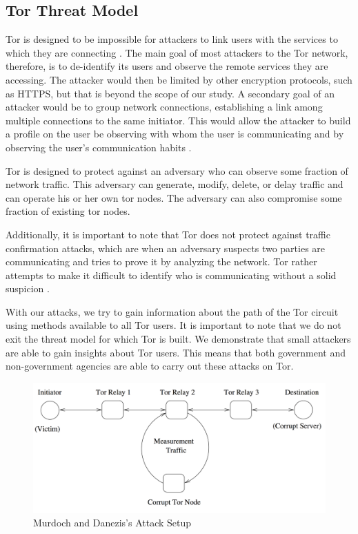 \documentclass[12pt,journal]{IEEEtran}
\begin{document}
\subsection{Tor Threat Model}
Tor is designed to be impossible for attackers to link users with the services to which they are connecting \cite{Dingledine:2004:TSO:1251375.1251396}. The main goal of most attackers to the Tor network, therefore, is to de-identify its users and observe the remote services they are accessing. The attacker would then be limited by other encryption protocols, such as HTTPS, but that is beyond the scope of our study. A secondary goal of an attacker would be to group network connections, establishing a link among multiple connections to the same initiator. This would allow the attacker to build a profile on the user be observing with whom the user is communicating and by observing the user’s communication habits \cite{Murdoch:2005:LTA:1058433.1059390}.
\par
Tor is designed to protect against an adversary who can observe some fraction of network traffic. This adversary can generate, modify, delete, or delay traffic and can operate his or her own tor nodes. The adversary can also compromise some fraction of existing tor nodes\cite{Dingledine:2004:TSO:1251375.1251396}.
\par
Additionally, it is important to note that Tor does not protect against traffic confirmation attacks, which are when an adversary suspects two parties are communicating and tries to prove it by analyzing the network. Tor rather attempts to make it difficult to identify who is communicating without a solid suspicion \cite{Murdoch:2005:LTA:1058433.1059390}.
\par
With our attacks, we try to gain information about the path of the Tor circuit using methods available to all Tor users. It is important to note that we do not exit the threat model for which Tor is built. We demonstrate that small attackers are able to gain insights about Tor users. This means that both government and non-government agencies are able to carry out these attacks on Tor.

\begin{figure}

 \center
  \includegraphics[width=\textwidth]{figures/murdochattacksetup.png}
  \caption{Murdoch and Danezis's Attack Setup \cite{Murdoch:2005:LTA:1058433.1059390}}
  \label{murdochsetup}
\end{figure}
\end{document}
